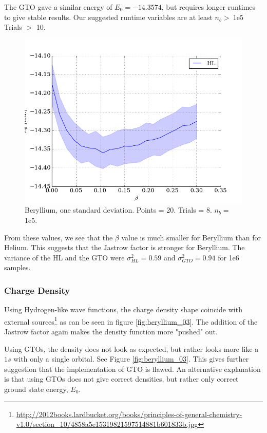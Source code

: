 \documentclass[twocolumns, a4paper,11pt,fleqn]{extarticle}
\begin{document}
\noindent 

The GTO gave a similar energy of $E_0 = -14.3574$, 
but requires longer runtimes to give 
stable results. Our suggested runtime variables are at least $n_b > \:$1e5 Trials $>$ 10.
\begin{figure}[H]
	\includegraphics[width=\columnwidth]{../res/plot/beryllium_01/beryllium_01_pretty.png}
	\caption{Beryllium, one standard deviation. 
	Points = 20. Trials = 8.	$n_b = \:$1e5.}
	\label{fig:beryllium_01}
\end{figure}

From these values, we see that the $\beta$ value is much smaller for Beryllium
than for Helium. This suggests that the Jastrow factor is stronger for
Beryllium. The variance of the HL and the GTO were $\sigma_{HL}^2 = 0.59$ 
and $\sigma_{GTO}^2 = 0.94$ for 1e6 samples.

\subsubsection{Charge Density}
Using Hydrogen-like wave functions, the charge density shape coincide with external 
sources\footnote{\url{http://2012books.lardbucket.org/books/principles-of-general-chemistry-v1.0/section_10/4858a5e15319821597514881b601833b.jpg}} as can be seen in figure
\ref{fig:beryllium_03}. The addition of the Jastrow factor again makes the
density function more "pushed" out. 

Using GTOs, the density does not look as expected, but rather
looks more like a $1s$ with only a single orbital. See Figure \ref{fig:beryllium_03}. 
This gives further suggestion that 
the implementation of GTO is flawed. An alternative explanation is that using
GTOs does not give correct densities, but rather only correct ground state energy, $E_0$.
\end{document}
